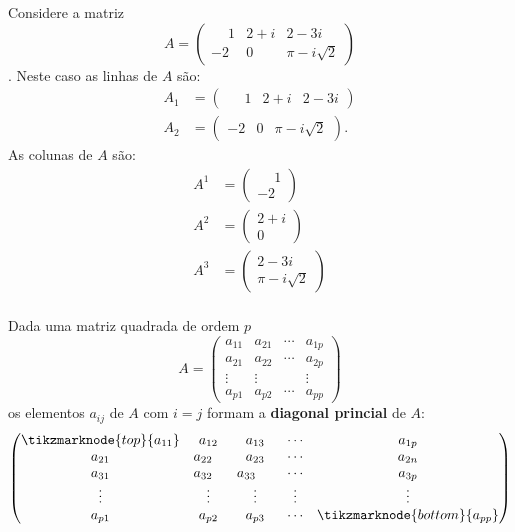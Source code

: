 \begin{exemplo}
  Considere a matriz
  \[
    A = \begin{pmatrix}
      \phantom{-} 1 & 2 + i & 2 - 3i\\
      -2 & 0 & \pi - i\sqrt{2}
    \end{pmatrix}
  \].
  Neste caso as linhas de $A$ são:
  \begin{align*}
    A_1 &= \begin{pmatrix}\phantom{-} 1 & 2 + i & 2 - 3i\end{pmatrix}\\
    A_2 &= \begin{pmatrix}-2 & 0 & \pi - i\sqrt{2}\end{pmatrix}.
  \end{align*}
  As colunas de $A$ são:
  \begin{align*}
    A^1 &= \begin{pmatrix}
      \phantom{-} 1\\-2
      \end{pmatrix}\\
    A^2 &= \begin{pmatrix}
      2 + i\\0
      \end{pmatrix}\\
    A^3 &= \begin{pmatrix}
      2 - 3i\\\pi - i\sqrt{2}
      \end{pmatrix}\\
  \end{align*}
\end{exemplo}

Dada uma matriz quadrada de ordem $p$
\[
  A = \begin{pmatrix}
    a_{11} & a_{21} & \cdots & a_{1p}\\
    a_{21} & a_{22} & \cdots & a_{2p}\\
    \vdots & \vdots & & \vdots\\
    a_{p1} & a_{p2} & \cdots & a_{pp}
  \end{pmatrix}
\]
os elementos $a_{ij}$ de $A$ com $i = j$ formam a \textbf{diagonal princial} de $A$:
\[
  \begin{pmatrix}
    \tikzmarknode{top}{a_{11}} & a_{12} & a_{13} & \cdots  & a_{1p}\\
    a_{21} & a_{22} \phantom{-} & a_{23} & \cdots  & a_{2n}\\
    a_{31} & a_{32}\phantom{-} & a_{33} \phantom{-1} & \cdots  & a_{3p}\\
    \vdots  & \vdots   & \vdots  & \vdots  & \vdots\\
    a_{p1} & a_{p2} & a_{p3} & \cdots  & \tikzmarknode{bottom}{a_{pp}}\\
  \end{pmatrix}
\]

